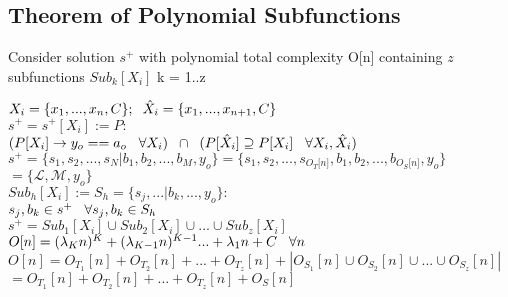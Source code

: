 \documentclass[11pt]{article}
\begin{document}
\subsection{Theorem of Polynomial Subfunctions}
Consider solution $s^+$ with polynomial total complexity O[n] containing $z$ subfunctions $Sub_k[X_i]$ k = 1..z
\vspace{1mm}
\begin{center}
$
X_i = \{x_1,...,x_n,C\}; \hspace{2mm} \hat{X}_i = \{x_1,...,x_{n+1},C\}
$
\\ \vspace{2mm}
$
s^+ = s^+[X_i] := P :
$
\\ \vspace{2mm}
$
(P \lbrack X_i \rbrack \rightarrow y_{o} == a_{o} \hspace{3mm} \forall X_i) \hspace{2mm} \cap \hspace{2mm} (P[\hat{X}_i] \supseteq P[X_i] \hspace{3mm} \forall X_i,\hat{X}_i)
$
\\ \vspace{4mm}
$
s^+ = \{ s_1,s_2,...,s_N|b_1,b_2,...,b_M,y_o\} = \{ s_1,s_2,...,s_{O_T \lbrack n \rbrack }, b_1, b_2,...,b_{O_S \lbrack n \rbrack},y_o \}
$
\\ \vspace{2mm}
$
= \{ \mathcal{L},\mathcal{M},y_o\}
$
\\ \vspace{6mm}
$
Sub_h[X_i] := S_h = \{s_j,...|b_k,...,y_o\}:
$
\\ \vspace{2mm}
$
s_j, b_k \in s^+ \hspace{3mm} \forall s_j,b_k \in S_h
$
\\ \vspace{6mm}
$
s^+ = Sub_1[X_i] \cup Sub_2[X_i] \cup ... \cup Sub_z[X_i]
$
\\ \vspace{6mm}
$
O[n] = (\lambda_K n)^K + (\lambda_{K-1} n)^{K-1}... + \lambda_1 n + C \hspace{3mm} \forall n
$
\\ \vspace{2mm}
$
O[n] = O_{T_1}[n] + O_{T_2}[n] + ... + O_{T_z}[n] + |O_{S_1}[n] \cup O_{S_2}[n] \cup  ... \cup O_{S_z}[n]|
$
\\ \vspace{2mm}
$
= O_{T_1}[n] + O_{T_2}[n] + ... + O_{T_z}[n] + O_S[n]
$
\end{center}
\end{document}
